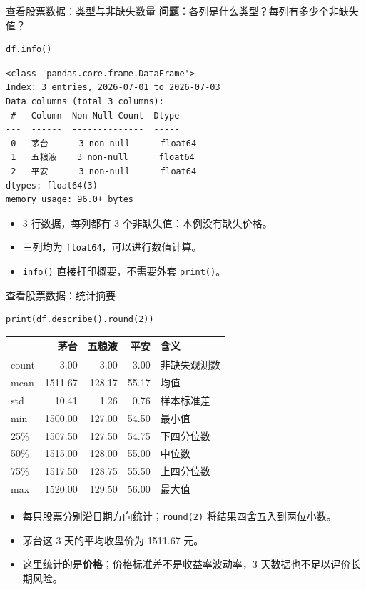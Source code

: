 \documentclass[9pt]{ctexbeamer}
\begin{document}
\begin{frame}[fragile]{查看股票数据：类型与非缺失数量}
\small \textbf{问题：}各列是什么类型？每列有多少个非缺失值？
\begin{lstlisting}
df.info()
\end{lstlisting}
\begin{lstlisting}[basicstyle=\ttfamily\scriptsize]
<class 'pandas.core.frame.DataFrame'>
Index: 3 entries, 2026-07-01 to 2026-07-03
Data columns (total 3 columns):
 #   Column  Non-Null Count  Dtype
---  ------  --------------  -----
 0   茅台      3 non-null      float64
 1   五粮液    3 non-null      float64
 2   平安      3 non-null      float64
dtypes: float64(3)
memory usage: 96.0+ bytes
\end{lstlisting}
\begin{itemize}
\item 3 行数据，每列都有 3 个非缺失值：本例没有缺失价格。
\item 三列均为 \texttt{float64}，可以进行数值计算。
\item \texttt{info()} 直接打印概要，不需要外套 \texttt{print()}。
\end{itemize}
\end{frame}

\begin{frame}[fragile]{查看股票数据：统计摘要}
\begin{lstlisting}
print(df.describe().round(2))
\end{lstlisting}
\begin{center}
\small
\begin{tabular}{lrrrl}
\toprule
 & 茅台 & 五粮液 & 平安 & 含义 \\
\midrule
count & 3.00 & 3.00 & 3.00 & 非缺失观测数 \\
mean & 1511.67 & 128.17 & 55.17 & 均值 \\
std & 10.41 & 1.26 & 0.76 & 样本标准差 \\
min & 1500.00 & 127.00 & 54.50 & 最小值 \\
25\% & 1507.50 & 127.50 & 54.75 & 下四分位数 \\
50\% & 1515.00 & 128.00 & 55.00 & 中位数 \\
75\% & 1517.50 & 128.75 & 55.50 & 上四分位数 \\
max & 1520.00 & 129.50 & 56.00 & 最大值 \\
\bottomrule
\end{tabular}
\end{center}
\begin{itemize}
\item 每只股票分别沿日期方向统计；\texttt{round(2)} 将结果四舍五入到两位小数。
\item 茅台这 3 天的平均收盘价为 1511.67 元。
\item 这里统计的是\textbf{价格}；价格标准差不是收益率波动率，3 天数据也不足以评价长期风险。
\end{itemize}
\end{frame}
\end{document}
